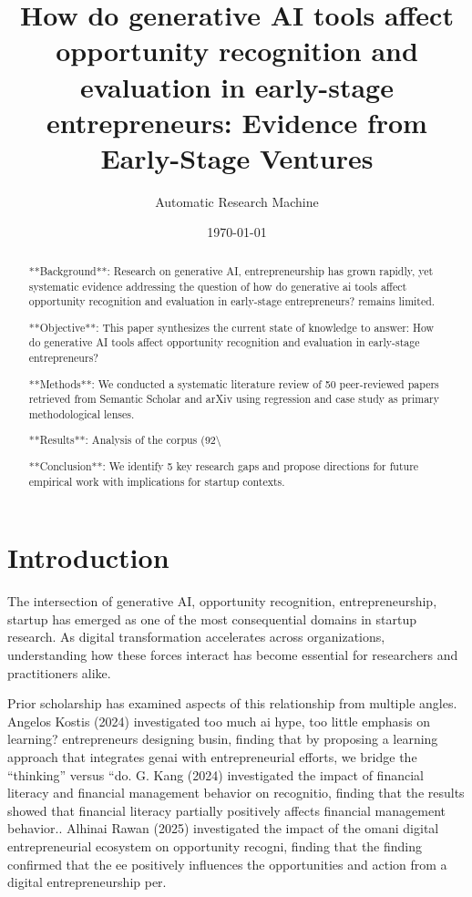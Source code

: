 \documentclass[11pt, a4paper]{article}
\title{How do generative AI tools affect opportunity recognition and evaluation in early-stage entrepreneurs: Evidence from Early-Stage Ventures}
\author{Automatic Research Machine}
\date{\today}
\begin{document}
\maketitle

\begin{abstract}
**Background**: Research on generative AI, entrepreneurship has grown rapidly, yet systematic evidence addressing the question of how do generative ai tools affect opportunity recognition and evaluation in early-stage entrepreneurs? remains limited.

**Objective**: This paper synthesizes the current state of knowledge to answer: How do generative AI tools affect opportunity recognition and evaluation in early-stage entrepreneurs?

**Methods**: We conducted a systematic literature review of 50 peer-reviewed papers retrieved from Semantic Scholar and arXiv using regression and case study as primary methodological lenses.

**Results**: Analysis of the corpus (92\textbackslash{}%

**Conclusion**: We identify 5 key research gaps and propose directions for future empirical work with implications for startup contexts.
\end{abstract}

\section{Introduction}
The intersection of generative AI, opportunity recognition, entrepreneurship, startup has emerged as one of the most consequential domains in startup research. As digital transformation accelerates across organizations, understanding how these forces interact has become essential for researchers and practitioners alike.

Prior scholarship has examined aspects of this relationship from multiple angles. Angelos Kostis (2024) investigated too much ai hype, too little emphasis on learning? entrepreneurs designing busin, finding that by proposing a learning approach that integrates genai with entrepreneurial efforts, we bridge the “thinking” versus “do. G. Kang (2024) investigated the impact of financial literacy and financial management behavior on recognitio, finding that the results showed that financial literacy partially positively affects financial management behavior.. Alhinai Rawan (2025) investigated the impact of the omani digital entrepreneurial ecosystem on opportunity recogni, finding that the finding confirmed that the ee positively influences the opportunities and action from a digital entrepreneurship per. 
\end{document}
